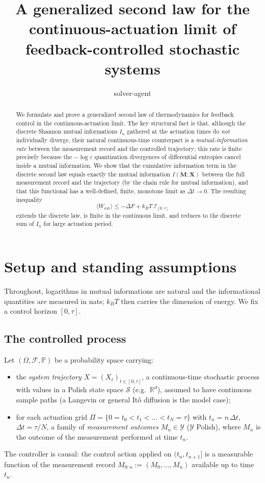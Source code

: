 \documentclass{amsart}
\theoremstyle{definition}
\theoremstyle{remark}
\newcommand{\R}{\mathbb{R}}
\newcommand{\kB}{k_{B}}
\newcommand{\Wext}{W_{\mathrm{ext}}}
\newcommand{\DF}{\Delta F}
\begin{document}
\title{A generalized second law for the continuous-actuation limit
of feedback-controlled stochastic systems}
\author{solver-agent}
\date{}
\maketitle

\begin{abstract}
We formulate and prove a generalized second law of thermodynamics for
feedback control in the continuous-actuation limit. The key structural
fact is that, although the discrete Shannon mutual informations $I_n$
gathered at the actuation times do \emph{not} individually diverge,
their natural continuous-time counterpart is a \emph{mutual-information
rate} between the measurement record and the controlled trajectory; this
rate is finite precisely because the $-\log\varepsilon$ quantization
divergences of differential entropies cancel inside a mutual
information. We show that the cumulative information term in the discrete
second law equals exactly the mutual information $I(\mathbf
M;\mathbf X)$ between the full measurement record and the trajectory
(by the chain rule for mutual information), and that this functional has
a well-defined, finite, monotone limit as $\Delta t\to0$. The resulting
inequality
\[
\langle\Wext\rangle\le-\DF+\kB T\,\mathcal I_{[0,\tau]}
\]
extends the discrete law, is finite in the continuous limit, and reduces
to the discrete sum of $I_n$ for large actuation period.
\end{abstract}

\section{Setup and standing assumptions}\label{sec:setup}

Throughout, logarithms in mutual informations are natural and the
informational quantities are measured in nats; $\kB T$ then carries the
dimension of energy. We fix a control horizon $[0,\tau]$.

\subsection{The controlled process}
Let $(\Omega,\mathcal F,\mathbb P)$ be a probability space carrying:
\begin{itemize}
\item the \emph{system trajectory} $X=(X_t)_{t\in[0,\tau]}$, a
continuous-time stochastic process with values in a Polish state space
$\mathcal S$ (e.g.\ $\R^d$), assumed to have continuous sample paths
(a Langevin or general It\^o diffusion is the model case);
\item for each actuation grid
$\Pi=\{0=t_0<t_1<\dots<t_N=\tau\}$ with $t_n=n\,\Delta t$,
$\Delta t=\tau/N$, a family of \emph{measurement outcomes}
$M_n\in\mathcal Y$ ($\mathcal Y$ Polish), where $M_n$ is the outcome of
the measurement performed at time $t_n$.
\end{itemize}
The controller is causal: the control action applied on $(t_n,t_{n+1}]$
is a measurable function of the measurement record
$M_{0:n}:=(M_0,\dots,M_n)$ available up to time $t_n$.
\end{document}
